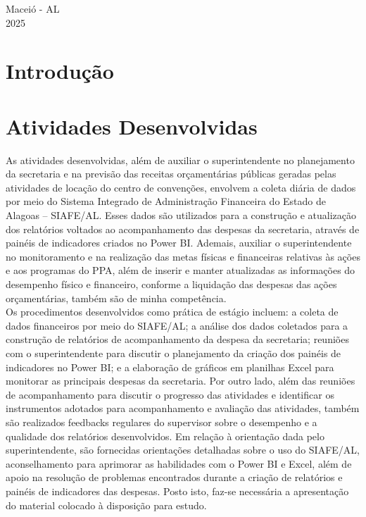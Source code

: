 \documentclass[12pt,a4paper]{article}
\begin{document}
	\vfill
	\begin{flushright}
		\centering Maceió - AL \\
		2025
	\end{flushright}
	
	\newpage
	

	
	\section{Introdução}
	
\hspace*{1,5cm}
	
	\section{Atividades Desenvolvidas}
	
\hspace*{1,5cm}As atividades desenvolvidas, além de auxiliar o superintendente no planejamento da 
secretaria e na previsão das receitas orçamentárias públicas geradas pelas atividades de locação 
do centro de convenções, envolvem a coleta diária de dados por meio do Sistema Integrado de 
Administração Financeira do Estado de Alagoas – SIAFE/AL. Esses dados são utilizados para 
a construção e atualização dos relatórios voltados ao acompanhamento das despesas da 
secretaria, através de painéis de indicadores criados no Power BI. Ademais, auxiliar o 
superintendente no monitoramento e na realização das metas físicas e financeiras relativas às 
ações e aos programas do PPA, além de inserir e manter atualizadas as informações do 
desempenho físico e financeiro, conforme a liquidação das despesas das ações orçamentárias, 
também são de minha competência. \\
\hspace*{1,5cm}Os procedimentos desenvolvidos como prática de estágio incluem: a coleta de dados 
financeiros por meio do SIAFE/AL; a análise dos dados coletados para a construção de 
relatórios de acompanhamento da despesa da secretaria; reuniões com o superintendente para 
discutir o planejamento da criação dos painéis de indicadores no Power BI; e a elaboração de 
gráficos em planilhas Excel para monitorar as principais despesas da secretaria. Por outro lado, 
além das reuniões de acompanhamento para discutir o progresso das atividades e identificar os 
instrumentos adotados para acompanhamento e avaliação das atividades, também são 
realizados feedbacks regulares do supervisor sobre o desempenho e a qualidade dos relatórios 
desenvolvidos. Em relação à orientação dada pelo superintendente, são fornecidas orientações 
detalhadas sobre o uso do SIAFE/AL, aconselhamento para aprimorar as habilidades com o 
Power BI e Excel, além de apoio na resolução de problemas encontrados durante a criação de 
relatórios e painéis de indicadores das despesas. Posto isto, faz-se necessária a apresentação do 
material colocado à disposição para estudo.
\end{document}
